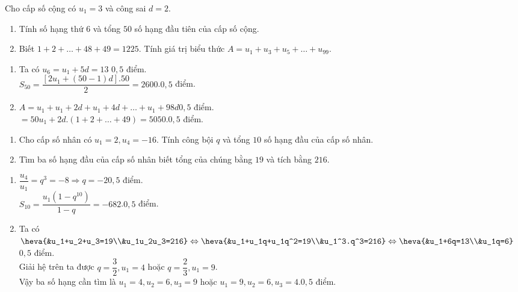 \begin{bt}%
Cho cấp số cộng có $u_1=3$ và công sai $d=2$.
\begin{enumerate}
\item Tính số hạng thứ $6$ và tổng $50$ số hạng đầu tiên của cấp số cộng.
\item Biết $1+2+\dots+48+49=1225$. Tính giá trị biểu thức $A=u_1+u_3+u_5+\dots +u_{99}$.
\end{enumerate}
\loigiai
{
\begin{enumerate}
\item Ta có $u_6=u_1+5d=13$ \dotfill $0,5$ điểm.\\
$S_{50}=\dfrac{\left[2u_1+(50-1)d\right].50}{2}=2600$.\dotfill $0,5$ điểm.
\item $A=u_1+u_1+2d+u_1+4d+ \dots + u_1+ 98d$\dotfill $0,5$ điểm.\\
$=50u_1+2d.(1+2+\dots +49)=5050$.\dotfill $0,5$ điểm.
\end{enumerate}
}
\end{bt}

\begin{bt}%
\begin{enumerate}
\item Cho cấp số nhân có $u_1=2, u_4=-16$. Tính công bội $q$ và tổng $10$ số hạng đầu của cấp số nhân.
\item Tìm ba số hạng đầu của cấp số nhân biết tổng của chúng bằng $19$ và tích bằng $216$.
\end{enumerate}
\loigiai
{
\begin{enumerate}
\item $\dfrac{u_4}{u_1}=q^3=-8 \Rightarrow q=-2$\dotfill $0,5$ điểm.\\
$S_{10}=\dfrac{u_1\left(1-q^{10}\right)}{1-q}=-682$.\dotfill $0,5$ điểm.
\item Ta có\\ $\heva{&u_1+u_2+u_3=19\\&u_1u_2u_3=216} \Leftrightarrow \heva{&u_1+u_1q+u_1q^2=19\\&u_1^3.q^3=216} \Leftrightarrow \heva{&u_1+6q=13\\&u_1q=6}$\dotfill $0,5$ điểm.\\
Giải hệ trên ta được $q=\dfrac{3}{2}, u_1=4$ hoặc $q=\dfrac{2}{3}, u_1=9$.\\
Vậy ba số hạng cần tìm là $u_1=4, u_2=6, u_3=9$ hoặc $u_1=9, u_2=6, u_3=4$.\dotfill $0,5$ điểm.
\end{enumerate}
}
\end{bt}

